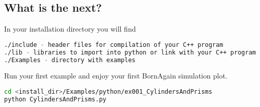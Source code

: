 \subsection{What is the next?}

In your installation directory you will find
\begin{lstlisting}[language=bash, style=commandline]
./include - header files for compilation of your C++ program
./lib - libraries to import into python or link with your C++ program
./Examples - directory with examples
\end{lstlisting}

Run your first example and enjoy your first BornAgain simulation plot.
\begin{lstlisting}[language=bash, style=commandline]
cd <install_dir>/Examples/python/ex001_CylindersAndPrisms
python CylindersAndPrisms.py
\end{lstlisting}







